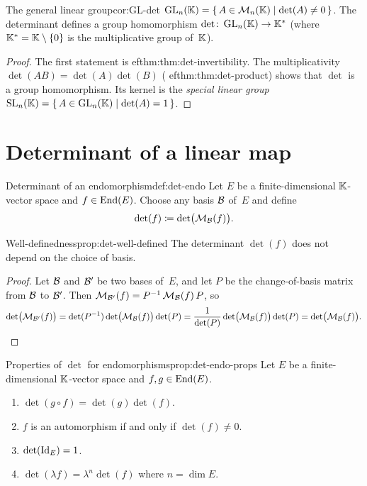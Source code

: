 \begin{corollary}{The general linear group}{cor:GL-det}
$\operatorname{GL}_n({\mathbb{K}}) = \left\{\,A\in\mathcal{M}_n({\mathbb{K}})\;\middle|\;\det(A)\neq 0\,\right\}$.
The determinant defines a group homomorphism
$\det\colon\operatorname{GL}_n({\mathbb{K}})\to{\mathbb{K}}^*$ (where ${\mathbb{K}}^*={\mathbb{K}}\setminus\left\{0\right\}$
is the multiplicative group of~${\mathbb{K}}$).
\end{corollary}

\begin{proof}
The first statement is 
ef{thm:thm:det-invertibility}. The
multiplicativity $\det(AB)=\det(A)\det(B)$
(
ef{thm:thm:det-product}) shows that $\det$ is a group homomorphism.
Its kernel is the \emph{special linear group}
$\operatorname{SL}_n({\mathbb{K}})=\left\{\,A\in\operatorname{GL}_n({\mathbb{K}})\;\middle|\;\det(A)=1\,\right\}$.
\end{proof}


\section{Determinant of a linear map}\label{sec:det-linear-map}

\begin{definition}{Determinant of an endomorphism}{def:det-endo}
Let $E$ be a finite-dimensional ${\mathbb{K}}$-vector space and
$f\in\operatorname{End}(E)$. Choose any basis ${\mathcal{B}}$ of~$E$ and define
\[
  \det(f) \coloneqq \det\bigl(\mathcal{M}_{\mathcal{B}}(f)\bigr).
\]
\end{definition}

\begin{proposition}{Well-definedness}{prop:det-well-defined}
The determinant $\det(f)$ does not depend on the choice of basis.
\end{proposition}

\begin{proof}
Let ${\mathcal{B}}$ and ${\mathcal{B}}'$ be two bases of~$E$, and let $P$ be the
change-of-basis matrix from ${\mathcal{B}}$ to ${\mathcal{B}}'$. Then
$\mathcal{M}_{{\mathcal{B}}'}(f) = {P}^{-1}\,\mathcal{M}_{\mathcal{B}}(f)\,P$, so
\[
  \det\bigl(\mathcal{M}_{{\mathcal{B}}'}(f)\bigr)
  = \det({P}^{-1})\det\bigl(\mathcal{M}_{\mathcal{B}}(f)\bigr)\det(P)
  = \frac{1}{\det(P)}\det\bigl(\mathcal{M}_{\mathcal{B}}(f)\bigr)\det(P)
  = \det\bigl(\mathcal{M}_{\mathcal{B}}(f)\bigr). \qedhere
\]
\end{proof}

\begin{proposition}{Properties of $\det$ for endomorphisms}{prop:det-endo-props}
Let $E$ be a finite-dimensional ${\mathbb{K}}$-vector space and
$f,g\in\operatorname{End}(E)$.
\begin{enumerate}[label=(\roman*)]
  \item $\det(g\circ f) = \det(g)\det(f)$.
  \item $f$ is an automorphism if and only if $\det(f)\neq 0$.
  \item $\det(\operatorname{Id}_E)=1$.
  \item $\det(\lambda f)=\lambda^n\det(f)$ where $n=\dim E$.
\end{enumerate}
\end{proposition}

